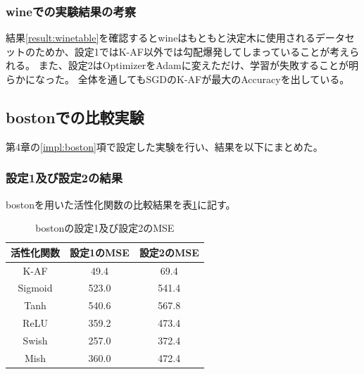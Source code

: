 \subsubsection{wineでの実験結果の考察}
結果\ref{result:winetable}を確認するとwineはもともと決定木に使用されるデータセットのためか、設定1ではK-AF以外では勾配爆発してしまっていることが考えられる。
また、設定2はOptimizerをAdamに変えただけ、学習が失敗することが明らかになった。
全体を通してもSGDのK-AFが最大のAccuracyを出している。







\subsection{bostonでの比較実験}
\label{ev:bostonでの比較実験}

第4章の\ref{impl:boston}項で設定した実験を行い、結果を以下にまとめた。
\subsubsection{設定1及び設定2の結果}

bostonを用いた活性化関数の比較結果を表\ref{result:bostontable}に記す。


\begin{table}[htbp]
    \begin{center}
        \caption{bostonの設定1及び設定2のMSE}
        \label{result:bostontable}
        \vspace{2mm} 
        \begin{tabular}{|c|c|c|}
            \hline
            活性化関数              & 設定1のMSE &  設定2のMSE \\
            \hline
            K-AF            & 49.4 & 69.4 \\
            \hline
            Sigmoid            & 523.0 & 541.4 \\
            \hline
            Tanh            & 540.6 &  567.8 \\
            \hline
            ReLU        & 359.2 & 473.4 \\
            \hline
            Swish           & 257.0 & 372.4 \\
            \hline
            Mish           & 360.0 & 472.4 \\
            \hline
    
        \end{tabular}
    \end{center}
\end{table}



